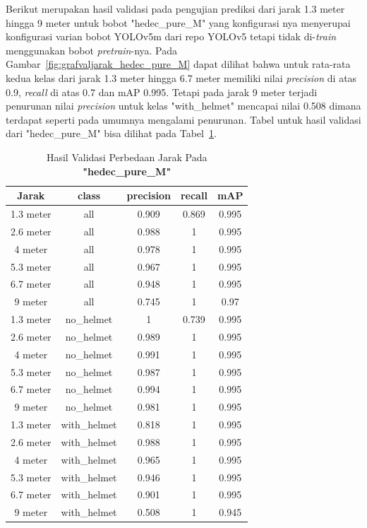 \begin{enumerate}
  \par Berikut merupakan hasil validasi pada pengujian prediksi dari jarak 1.3 meter hingga 9 meter untuk bobot "hedec\_pure\_M"
  yang konfigurasi nya menyerupai konfigurasi varian bobot YOLOv5m dari repo YOLOv5 tetapi tidak di-\emph{train} menggunakan bobot \emph{pretrain}-nya.
  Pada Gambar~\ref{fig:grafvaljarak_hedec_pure_M} dapat dilihat bahwa untuk rata-rata kedua kelas dari jarak 1.3 meter hingga 6.7 meter
  memiliki nilai \emph{precision} di atas 0.9, \emph{recall} di atas 0.7 dan mAP 0.995. Tetapi pada jarak 9 meter terjadi penurunan
  nilai \emph{precision} untuk kelas "with\_helmet" mencapai nilai 0.508 dimana terdapat seperti pada umumnya mengalami penurunan. 
  Tabel untuk hasil validasi dari "hedec\_pure\_M" bisa dilihat
  pada Tabel~\ref{tb:hasiljarak_hedec_pure_M}.
  
  \begin{longtable}{|c|c|c|c|c|}
    \caption{Hasil Validasi Perbedaan Jarak Pada \textbf{"hedec\_pure\_M"}}
    \label{tb:hasiljarak_hedec_pure_M}\\
    \hline
    Jarak     & class        & precision & recall & mAP    \\
    \hline
    1.3 meter & all          & 0.909     & 0.869  & 0.995  \\
    2.6 meter & all          & 0.988     & 1      & 0.995  \\
    4 meter   & all          & 0.978     & 1      & 0.995  \\
    5.3 meter & all          & 0.967     & 1      & 0.995  \\
    6.7 meter & all          & 0.948     & 1      & 0.995  \\
    9 meter   & all          & 0.745     & 1      & 0.97   \\
    1.3 meter & no\_helmet   & 1         & 0.739  & 0.995  \\
    2.6 meter & no\_helmet   & 0.989     & 1      & 0.995  \\
    4 meter   & no\_helmet   & 0.991     & 1      & 0.995  \\
    5.3 meter & no\_helmet   & 0.987     & 1      & 0.995  \\
    6.7 meter & no\_helmet   & 0.994     & 1      & 0.995  \\
    9 meter   & no\_helmet   & 0.981     & 1      & 0.995  \\
    1.3 meter & with\_helmet & 0.818     & 1      & 0.995  \\
    2.6 meter & with\_helmet & 0.988     & 1      & 0.995  \\
    4 meter   & with\_helmet & 0.965     & 1      & 0.995  \\
    5.3 meter & with\_helmet & 0.946     & 1      & 0.995  \\
    6.7 meter & with\_helmet & 0.901     & 1      & 0.995  \\
    9 meter   & with\_helmet & 0.508     & 1      & 0.945  \\
    \hline
  \end{longtable}


\end{enumerate}
